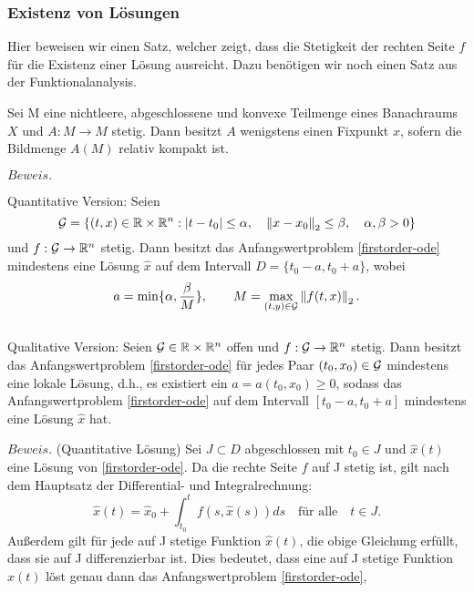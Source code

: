 \subsubsection{Existenz von Lösungen}
Hier beweisen wir einen Satz, welcher zeigt, dass die Stetigkeit der rechten Seite $f$ für die Existenz einer
Lösung ausreicht. Dazu benötigen wir noch einen Satz aus der Funktionalanalysis.
\begin{satz}
    Sei M eine nichtleere, abgeschlossene und konvexe Teilmenge eines Banachraums $X$ und $A:M \rightarrow M$ stetig.
    Dann besitzt $A$ wenigstens einen Fixpunkt $x$, sofern die Bildmenge $A(M)$ relativ kompakt ist.
\end{satz}
$Beweis.$ \cite[13,14]{sundermeierFixpunktsatzSchauder}
\begin{satz}
    Quantitative Version: Seien
    \[
            {\cal G}=\{(t,x) \in \mathbb{R} \times \mathbb{R}^{n}: |t-t_{0}| \leq \alpha, \quad
        \left\lVert x-x_{0} \right\rVert _{2} \leq\beta, \quad \alpha,\beta > 0 \}
    \]
    und $f:{\cal G} \rightarrow \mathbb{R}^{n}$ stetig. Dann besitzt das Anfangswertproblem \eqref{firstorder-ode}
    mindestens eine Lösung $\hat{x}$ auf dem Intervall $D=\{t_{0}-a,t_{0}+a\}$, wobei
    \[
        a=\min\{\alpha, \frac{\beta}{M}\}, \qquad M= \max_{(t,y)\in {\cal G}}\left\lVert f(t,x)\right\rVert_{2}.
    \]\\
    Qualitative Version: Seien ${\cal G}\in \mathbb{R} \times \mathbb{R}^{n}$ offen und $f:{\cal G} \rightarrow \mathbb{R}^{n}$ stetig.
    Dann besitzt das Anfangswertproblem \eqref{firstorder-ode} für jedes Paar $(t_{0},x_{0}) \in {\cal G}$ mindestens eine
    lokale Lösung, d.h., es existiert ein $a=a(t_{0},x_{0}) \geq 0$, sodass das Anfangswertproblem \eqref{firstorder-ode} auf
    dem Intervall $[t_{0}-a,t_{0}+a]$ mindestens eine Lösung $\hat{x}$ hat.
\end{satz}
$Beweis.$ (Quantitative Lösung) Sei $J\subset D$ abgeschlossen mit $t_0 \in J$ und $\hat{x}(t)$ eine Lösung von \eqref{firstorder-ode}.
Da die rechte Seite $f$ auf J stetig ist, gilt nach dem Hauptsatz der Differential- und Integralrechnung:
\[
    \hat{x}(t) = \hat{x}_0 + \int_{t_0}^{t} f(s, \hat{x}(s)) ds \quad \text{für alle} \quad t \in J.
\]
Außerdem gilt für jede auf J stetige Funktion $\hat{x}(t)$, die obige Gleichung erfüllt, dass sie auf J differenzierbar
ist. Dies bedeutet, dass eine auf J stetige Funktion $\hat{x}(t)$ löst genau dann das Anfangswertproblem \eqref{firstorder-ode},
